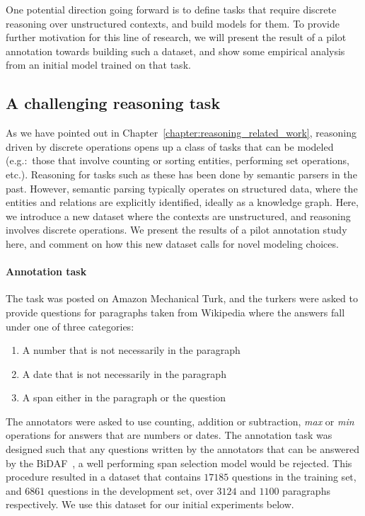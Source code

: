 One potential direction going forward is to define tasks
that require discrete reasoning over unstructured contexts, and build models for
them. To provide further motivation for this line of research, we will present
the result of a pilot annotation towards building such a dataset, and show some
empirical analysis from an initial model trained on that task.

\subsection{A challenging reasoning task}
As we have pointed out in Chapter~\ref{chapter:reasoning_related_work},
reasoning driven by discrete operations opens up a class of tasks that can be
modeled (e.g.:\ those that involve counting or sorting entities, performing set
operations, etc.). Reasoning for tasks such as these has been done by semantic
parsers in the past. However, semantic parsing typically operates on structured
data, where the entities and relations are explicitly identified, ideally as a
knowledge graph. Here, we introduce a new dataset where the contexts
are unstructured, and reasoning involves discrete operations. We present the
results of a pilot annotation study here, and comment on how this new dataset
calls for novel modeling choices.

\paragraph{Annotation task} The task was posted on Amazon Mechanical Turk, and the turkers were
asked to provide questions for paragraphs taken from Wikipedia where the answers
fall under one of three categories:
\begin{enumerate}
	\item A number that is not necessarily in the paragraph
	\item A date that is not necessarily in the paragraph
	\item A span either in the paragraph or the question 
\end{enumerate}
The annotators were asked to use counting, addition or subtraction, \textit{max}
or \textit{min} operations for answers that are numbers or dates. The annotation
task was designed such that any questions written by the annotators that can be
answered by the BiDAF~\citep{Seo2016BidirectionalAF}, a well performing
span selection model would be rejected. This procedure resulted in a dataset
that contains $17185$ questions in the training set, and $6861$ questions in the
development set, over $3124$ and $1100$ paragraphs respectively. We use this
dataset for our initial experiments below.

